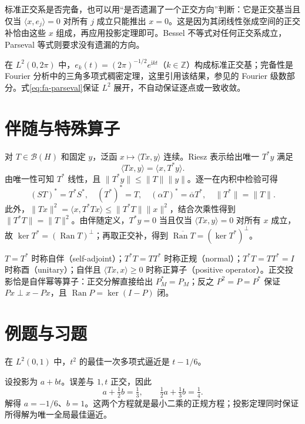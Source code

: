 \documentclass[UTF8,12pt,a4paper,fontset=fandol]{ctexbook}
\begin{document}
标准正交系是否完备，也可以用“是否遗漏了一个正交方向”判断：它是正交基当且仅当 $\langle x,e_j\rangle=0$ 对所有 $j$ 成立只能推出 $x=0$。这是因为其闭线性张成空间的正交补恰由这些 $x$ 组成，再应用投影定理即可。Bessel 不等式对任何正交系成立，Parseval 等式则要求没有遗漏的方向。

在 $L^2(0,2\pi)$ 中，$e_k(t)=(2\pi)^{-1/2}e^{\mathrm ikt}$（$k\in\mathbb Z$）构成标准正交基；完备性是 Fourier 分析中的三角多项式稠密定理，这里引用该结果，参见\cite{teschl-ra}的 Fourier 级数部分。式\eqref{eq:fa-parseval}保证 $L^2$ 展开，不自动保证逐点或一致收敛。

\section{伴随与特殊算子}
对 $T\in\mathcal B(H)$ 和固定 $y$，泛函 $x\mapsto\langle Tx,y\rangle$ 连续。Riesz 表示给出唯一 $T^*y$ 满足
\[
 \langle Tx,y\rangle=\langle x,T^*y\rangle.
\]
由唯一性可知 $T^*$ 线性，且 $\|T^*y\|\leq\|T\|\|y\|$。逐一在内积中检验可得
\[
 (ST)^*=T^*S^*,\quad (T^*)^*=T,\quad
 (\alpha T)^*=\overline\alpha T^*,\quad\|T^*\|=\|T\|.
\]
此外，$\|Tx\|^2=\langle x,T^*Tx\rangle\leq\|T^*T\|\|x\|^2$，结合次乘性得到 $\|T^*T\|=\|T\|^2$。由伴随定义，$T^*y=0$ 当且仅当 $\langle Tx,y\rangle=0$ 对所有 $x$ 成立，故 $\ker T^*=(\operatorname{Ran}T)^\perp$；再取正交补，得到 $\overline{\operatorname{Ran}T}=(\ker T^*)^\perp$。

$T=T^*$ 时称自伴（self-adjoint）；$T^*T=TT^*$ 时称正规（normal）；$T^*T=TT^*=I$ 时称酉（unitary）；自伴且 $\langle Tx,x\rangle\geq0$ 时称正算子（positive operator）。正交投影恰是自伴幂等算子：正交分解直接给出 $P_M^*=P_M$；反之 $P^2=P=P^*$ 保证 $Px\perp x-Px$，且 $\operatorname{Ran}P=\ker(I-P)$ 闭。

\section{例题与习题}
\begin{example}[最佳一次逼近]
在 $L^2(0,1)$ 中，$t^2$ 的最佳一次多项式逼近是 $t-1/6$。
\end{example}
\begin{solve}
设投影为 $a+bt$。误差与 $1,t$ 正交，因此
\[
 a+\tfrac12b=\tfrac13,\qquad \tfrac12a+\tfrac13b=\tfrac14.
\]
解得 $a=-1/6$、$b=1$。这两个方程就是最小二乘的正规方程；投影定理同时保证所得解为唯一全局最佳逼近。
\end{solve}
\end{document}
